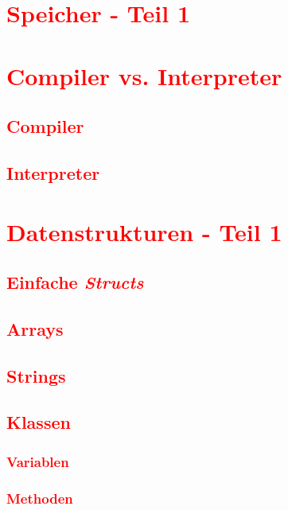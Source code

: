 \cleardoublepage\chapter{\textcolor{red}{Speicher - Teil 1}}\label{chap:memory-1}

\cleardoublepage\chapter{\textcolor{red}{Compiler vs. Interpreter}}\label{chap:compiler-vs-interpreter}
\section{\textcolor{red}{Compiler}}\label{sec:compiler}
\section{\textcolor{red}{Interpreter}}\label{sec:interpreter}

\cleardoublepage\chapter{\textcolor{red}{Datenstrukturen - Teil 1}}\label{chap:datastructures-1}
\section{\textcolor{red}{Einfache \textit{Structs}}}\label{sec:structs}
\section{\textcolor{red}{Arrays}}\label{sec:arrays}
\section{\textcolor{red}{Strings}}\label{sec:strings}
\section{\textcolor{red}{Klassen}}\label{sec:classes}
\subsection{\textcolor{red}{Variablen}}\label{sec:class-variables}
\subsection{\textcolor{red}{Methoden}}\label{sec:class-methods}

